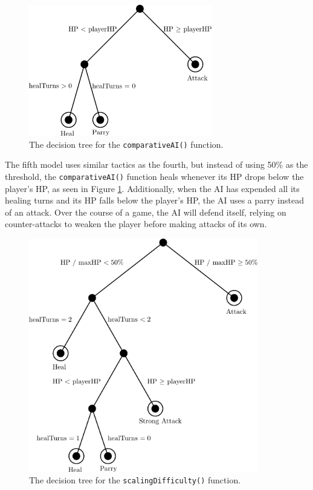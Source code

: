 \begin{figure}[H]
  \centering
  \includegraphics[width=8cm]{figures/AIComparative.png}
  \caption{The decision tree for the \texttt{comparativeAI()} function.}
  \label{fig:AI5}
\end{figure}

The fifth model uses similar tactics as the fourth, but instead of using 50\% as the threshold, the \texttt{comparativeAI()} function heals whenever its HP drops below the player's HP, as seen in Figure \ref{fig:AI5}. Additionally, when the AI has expended all its healing turns and its HP falls below the player's HP, the AI uses a parry instead of an attack. Over the course of a game, the AI will defend itself, relying on counter-attacks to weaken the player before making attacks of its own.

\begin{figure}[H]
  \centering
  \includegraphics[width=10cm]{figures/AIScaling.png}
  \caption{The decision tree for the \texttt{scalingDifficulty()} function.}
  \label{fig:AI6}
\end{figure}

